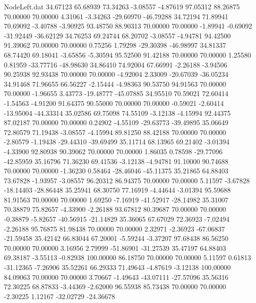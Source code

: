 \begin{filecontents}{NodeLeft.dat}
  34.67123   65.68939   73.34263    -3.08557   -4.87619   97.05312   88.26875   70.00000   70.00000    4.31061   -3.34263  -29.60970  -46.79288
  34.72194   71.89941   70.69092    -3.40788   -3.90925   93.48750   88.90313   70.00000   70.00000   -1.89941   -0.69092  -31.92449  -36.62129
  34.76253   69.24744   68.20702    -3.08557   -4.94781   94.42500   91.39062   70.00000   70.00000    0.75256    1.79298  -29.30398  -46.98997
  34.81337   68.74420   69.18041    -3.65856   -5.30594   95.52500   91.42188   70.00000   70.00000    1.25580    0.81959  -33.77716  -48.98630
  34.86410   74.92004   67.66991    -2.26188   -3.94506   90.25938   92.93438   70.00000   70.00000   -4.92004    2.33009  -20.67039  -36.05234
  34.91468   71.96655   66.56227    -2.15444   -4.98363   90.53750   94.91563   70.00000   70.00000   -1.96655    3.43773  -19.48777  -45.07885
  34.95510   70.59021   72.60414    -1.54563   -4.91200   91.64375   90.55000   70.00000   70.00000   -0.59021   -2.60414  -13.95004  -44.33314
  35.02586   69.75098   74.55109    -3.12138   -4.15994   92.44375   87.02187   70.00000   70.00000    0.24902   -4.55109  -29.63773  -39.49895
  35.06649   72.80579   71.19438    -3.08557   -4.15994   89.81250   88.42188   70.00000   70.00000   -2.80579   -1.19438  -29.44310  -39.69499
  35.11714   68.13965   69.21402    -3.01394   -4.33900   92.80938   90.39062   70.00000   70.00000    1.86035    0.78598  -29.77096  -42.85959
  35.16796   71.36230   69.41536    -3.12138   -4.94781   91.10000   90.74688   70.00000   70.00000   -1.36230    0.58464  -28.46046  -45.11375
  35.21865   64.88403   73.67828    -1.93957   -3.08557   96.20312   86.94375   70.00000   70.00000    5.11597   -3.67828  -18.14403  -28.86448
  35.25941   68.30750   77.16919    -4.44644   -3.01394   95.59688   81.91563   70.00000   70.00000    1.69250   -7.16919  -41.52917  -28.14982
  35.31007   70.38879   75.82657    -4.33900   -2.26188   93.67812   80.39687   70.00000   70.00000   -0.38879   -5.82657  -40.56915  -21.14829
  35.36065   67.67029   72.36923    -7.02494   -2.26188   95.76875   81.98438   70.00000   70.00000    2.32971   -2.36923  -67.06837  -21.59458
  35.42142   66.83044   67.20001    -5.59244   -3.37207   97.68438   86.56250   70.00000   70.00000    3.16956    2.79999  -51.86901  -31.27539
  35.47197   64.88403   69.38187    -3.55113   -0.82938  100.00000   86.18750   70.00000   70.00000    5.11597    0.61813  -31.12365   -7.26906
  35.52261   66.29333   71.49643    -4.87619   -3.12138  100.00000   84.09063   70.00000   70.00000    3.70667   -1.49643  -43.07111  -27.57096
  35.56316   72.30225   68.87833    -3.44369   -2.62000   96.55938   85.73438   70.00000   70.00000   -2.30225    1.12167  -32.02729  -24.36678

\end{filecontents}

